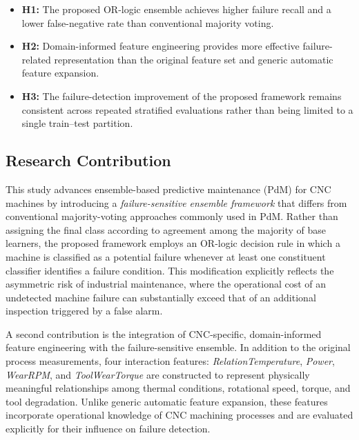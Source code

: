 \documentclass[final,5p, twocolumn]{elsarticle}
\begin{document}
\begin{itemize}
\item \textbf{H1:} The proposed OR-logic ensemble achieves higher failure recall and a lower false-negative rate than conventional majority voting.

\item \textbf{H2:} Domain-informed feature engineering provides more effective failure-related representation than the original feature set and generic automatic feature expansion.

\item \textbf{H3:} The failure-detection improvement of the proposed framework remains consistent across repeated stratified evaluations rather than being limited to a single train--test partition.

\end{itemize}




\subsection{Research Contribution}

This study advances ensemble-based predictive maintenance (PdM) for CNC machines by introducing a \textit{failure-sensitive ensemble framework} that differs from conventional majority-voting approaches commonly used in PdM. Rather than assigning the final class according to agreement among the majority of base learners, the proposed framework employs an OR-logic decision rule in which a machine is classified as a potential failure whenever at least one constituent classifier identifies a failure condition. This modification explicitly reflects the asymmetric risk of industrial maintenance, where the operational cost of an undetected machine failure can substantially exceed that of an additional inspection triggered by a false alarm. 

A second contribution is the integration of CNC-specific, domain-informed feature engineering with the failure-sensitive ensemble. In addition to the original process measurements, four interaction features: \textit{RelationTemperature}, \textit{Power}, \textit{WearRPM}, and \textit{ToolWearTorque} are constructed to represent physically meaningful relationships among thermal conditions, rotational speed, torque, and tool degradation. Unlike generic automatic feature expansion, these features incorporate operational knowledge of CNC machining processes and are evaluated explicitly for their influence on failure detection.
\end{document}
